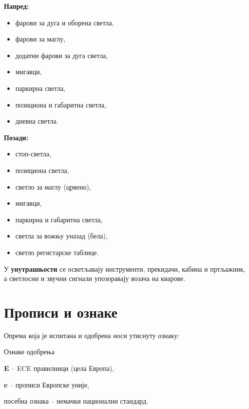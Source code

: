 \documentclass{report}
\begin{document}
\begin{minipage}[t]{0.48\linewidth}
\textbf{Напред:}
\begin{itemize}[noitemsep, topsep=2pt, leftmargin=1.2em]
    \item фарови за дуга и оборена светла,
    \item фарови за маглу,
    \item додатни фарови за дуга светла,
    \item мигавци,
    \item паркирна светла,
    \item позициона и габаритна светла,
    \item дневна светла.
\end{itemize}
\end{minipage}\hfill
\begin{minipage}[t]{0.48\linewidth}
\textbf{Позади:}
\begin{itemize}[noitemsep, topsep=2pt, leftmargin=1.2em]
    \item стоп-светла,
    \item позициона светла,
    \item светло за маглу (црвено),
    \item мигавци,
    \item паркирна и габаритна светла,
    \item светла за вожњу уназад (бела),
    \item светло регистарске таблице.
\end{itemize}
\end{minipage}

\medskip
У \textbf{унутрашњости} се осветљавају инструменти, прекидачи, кабина и
пртљажник, а светлосни и звучни сигнали упозоравају возача на кварове.

\section{Прописи и ознаке}

Опрема која је испитана и одобрена носи утиснуту ознаку:

\begin{podela}{Ознаке одобрења}
\begin{lista}
    \item \textbf{E} -- ECE правилници (цела Европа),
    \item \textbf{e} -- прописи Европске уније,
    \item посебна ознака -- немачки национални стандард.
\end{lista}
\end{podela}
\end{document}
